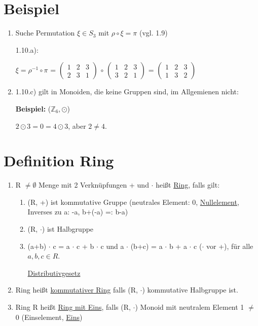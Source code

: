 \documentclass[a4paper, openany]{book}
\begin{document}
  \section{Beispiel}

  \begin{enumerate}[label=(\alph*)]
    \item Suche Permutation $\xi \in S_3$ mit $\rho \circ \xi = \pi$ (vgl. 1.9)

    1.10.a):

    $\xi = \rho^{-1} \circ \pi$ = $\begin{pmatrix}1 & 2 & 3 \\ 2 & 3 & 1 \end{pmatrix}$ $\circ$ $\begin{pmatrix} 1 & 2 & 3 \\ 3 & 2 & 1 \end{pmatrix}$ = $\begin{pmatrix}1 & 2 & 3 \\ 1 & 3 & 2 \end{pmatrix}$

    \item 1.10.c) gilt in Monoiden, die keine Gruppen sind, im Allgemienen nicht:

    \textbf{Beispiel:} ($\mathbb{Z}_6, \odot$)

    $2 \odot 3 = 0 = 4 \odot 3$, aber $2 \neq 4$.
  \end{enumerate}

   \section{Definition Ring}

  \begin{enumerate}[label=(\alph*)]
    \item  R $\neq \emptyset$ Menge mit 2 Verknüpfungen + und $\cdot$ heißt \underline{Ring}, falls gilt:
   
      \begin{enumerate}
        \item (R, +) ist kommutative Gruppe (neutrales Element: 0, \underline{Nullelement}, Inverses zu a: -a, b+(-a) =: b-a)
        \item (R, $\cdot$) ist Halbgruppe
        \item (a+b) $\cdot$ c = a $\cdot$ c + b $\cdot$ c und a $\cdot$ (b+c) = a $\cdot$ b + a $\cdot$ c ($\cdot$ vor +), für alle $a,b,c \in R$.

        \underline{Distributivgesetz}
      \end{enumerate}

    \item Ring heißt \underline{kommutativer Ring} falls (R, $\cdot$) kommutative Halbgruppe ist.
    \item Ring R heißt \underline{Ring mit Eins}, falls (R, $\cdot$) Monoid mit neutralem Element 1 $\neq$ 0 (Einselement, \underline{Eins})
  \end{enumerate}
\end{document}
